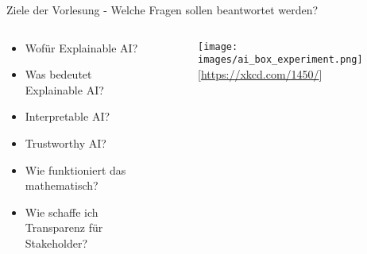 \documentclass[aspectratio=1610, xcolor=dvipsnames, 9pt]{beamer}
\begin{document}
\begin{frame}{Ziele der Vorlesung - Welche Fragen sollen beantwortet werden?}
  \begin{columns}
    \begin{column}{0.49\textwidth}
      \begin{itemize}
        \item Wofür Explainable AI? \newline
        \item Was bedeutet Explainable AI? \newline
        \item Interpretable AI?  \newline
        \item Trustworthy AI? \newline
        \item Wie funktioniert das mathematisch? \newline
        \item Wie schaffe ich Transparenz für Stakeholder?
        \end{itemize}
    \end{column}
    \begin{column}{0.5\textwidth}
 \begin{figure}
 \centering
             \texttt{[image: images/ai\_box\_experiment.png]}
             [\url{https://xkcd.com/1450/}]
 \end{figure}
    \end{column}
  \end{columns}
\end{frame}
\end{document}
